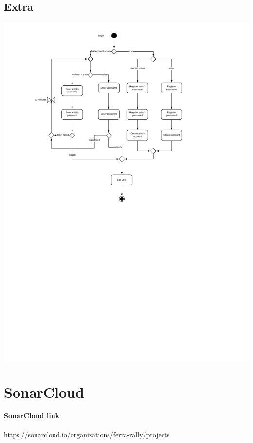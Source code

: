 \documentclass[11pt,a4paper]{article}
\begin{document}
\begin{itemize}
\subsection{Extra}
\includegraphics[scale=0.5]{logActivityDiagram.jpg}
\section{SonarCloud}
\paragraph{SonarCloud link} https://sonarcloud.io/organizations/ferra-rally/projects
\end{itemize}
\end{document}
